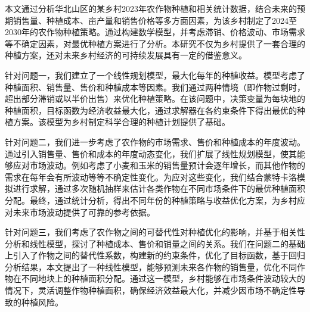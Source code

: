 

{\song\xiaosihao
\setlength{\parindent}{2em}
本文通过分析华北山区的某乡村2023年农作物种植和相关统计数据，结合未来的预期销售量、种植成本、亩产量和销售价格等多方面因素，为该乡村制定了2024至2030年的农作物种植策略。通过构建数学模型，并考虑滞销、价格波动、市场需求等不确定因素，对最优种植方案进行了分析。本研究不仅为乡村提供了一套合理的种植方案，还对未来乡村经济的可持续发展具有一定的借鉴意义。

\setlength{\parindent}{2em} 针对问题一，我们建立了一个线性规划模型，最大化每年的种植收益。模型考虑了种植面积、销售量、售价和种植成本等因素。我们通过两种情境（即作物过剩时，超出部分滞销或以半价出售）来优化种植策略。在该问题中，决策变量为每块地的种植面积，目标函数为经济收益最大化，通过求解器在各约束条件下得出最优的种植方案。该模型为乡村制定科学合理的种植计划提供了基础。

\setlength{\parindent}{2em} 针对问题二，我们进一步考虑了农作物的市场需求、售价和种植成本的年度波动。通过引入销售量、售价和成本的年度动态变化，我们扩展了线性规划模型，使其能够应对市场波动。例如考虑了小麦和玉米的销售量预计会逐年增长，而其他作物的需求在每年会有所波动等等不确定性变化。为应对这些变化，我们结合蒙特卡洛模拟进行求解，通过多次随机抽样来估计各类作物在不同市场条件下的最优种植面积分配。最终，通过统计分析，得出不同年份的种植策略与收益优化方案，为乡村应对未来市场波动提供了可靠的参考依据。

\setlength{\parindent}{2em} 针对问题三，我们考虑了农作物之间的可替代性对种植优化的影响，并基于相关性分析和线性模型，探讨了种植成本、售价和销量之间的关系。我们在问题二的基础上引入了作物之间的替代性系数，构建新的约束条件，优化了目标函数，基于回归分析结果，本文提出了一种线性模型，能够预测未来各作物的销售量，优化不同作物在不同地块上的种植面积分配。通过这一模型，乡村能够在市场条件波动较大的情况下，灵活调整作物种植面积，确保经济效益最大化，并减少因市场不确定性导致的种植风险。
}





